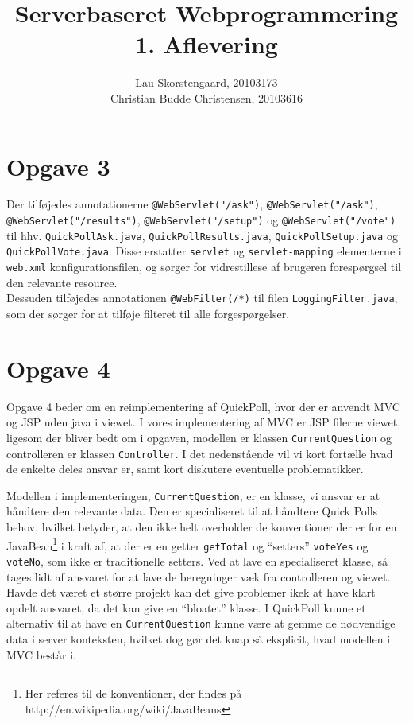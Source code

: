 \documentclass[a4paper,10pt]{article}
\author{Lau Skorstengaard, 20103173 \\Christian Budde Christensen, 20103616}
\title{Serverbaseret Webprogrammering\\1. Aflevering}
\begin{document}
\maketitle
\section*{Opgave 3}
Der tilføjedes annotationerne \texttt{@WebServlet("/ask")}, \texttt{@WebServlet("/ask")}, \texttt{@WebServlet("/results")}, \texttt{@WebServlet("/setup")} og \texttt{@WebServlet("/vote")} til hhv. \texttt{QuickPollAsk.java}, \texttt{QuickPollResults.java}, \texttt{QuickPollSetup.java} og \texttt{QuickPollVote.java}. Disse erstatter \texttt{servlet} og \texttt{servlet-mapping} elementerne i \texttt{web.xml} konfigurationsfilen, og sørger for vidrestillese af brugeren forespørgsel til den relevante resource. \\
Dessuden tilføjedes annotationen \texttt{@WebFilter(/*)} til filen \texttt{LoggingFilter.java}, som der sørger for at tilføje filteret til alle forgespørgelser.\\

\section*{Opgave 4}
Opgave 4 beder om en reimplementering af QuickPoll, hvor der er anvendt MVC og JSP uden java i viewet. I vores implementering af MVC er JSP filerne viewet, ligesom der bliver bedt om i opgaven, modellen er klassen \texttt{CurrentQuestion} og controlleren er klassen \texttt{Controller}. I det nedenstående vil vi kort fortælle hvad de enkelte deles ansvar er, samt kort diskutere eventuelle problematikker.

Modellen i implementeringen, \texttt{CurrentQuestion}, er en klasse, vi ansvar er at håndtere den relevante data. Den er specialiseret til at håndtere Quick Polls behov, hvilket betyder, at den ikke helt overholder de konventioner der er for en JavaBean\footnote{Her referes til de konventioner, der findes på http://en.wikipedia.org/wiki/JavaBeans} i kraft af, at der er en getter \texttt{getTotal} og ``setters'' \texttt{voteYes} og \texttt{voteNo}, som ikke er traditionelle setters. Ved at lave en specialiseret klasse, så tages lidt af ansvaret for at lave de beregninger væk fra controlleren og viewet. Havde det været et større projekt kan det give problemer ikek at have klart opdelt ansvaret, da det kan give en ``bloatet'' klasse. I QuickPoll kunne et alternativ til at have en \texttt{CurrentQuestion} kunne være at gemme de nødvendige data i server konteksten, hvilket dog gør det knap så eksplicit, hvad modellen i MVC består i.
\end{document}
